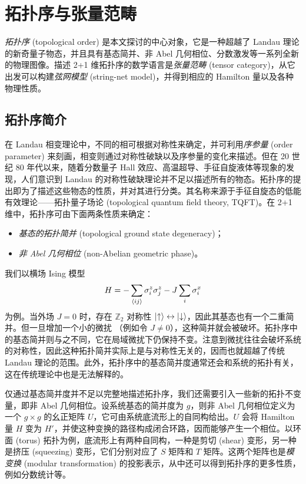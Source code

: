 \chapter{拓扑序与张量范畴}
\label{chap:topological-order}

\emph{拓扑序} (topological order) 是本文探讨的中心对象，它是一种超越了 Landau 理论的新奇量子物态，并且具有基态简并、非 Abel 几何相位、分数激发等一系列全新的物理图像。描述 2+1 维拓扑序的数学语言是\emph{张量范畴} (tensor category)，从它出发可以构建\emph{弦网模型} (string-net model)，并得到相应的 Hamilton 量以及各种物理性质。

\section{拓扑序简介}
\label{sec:topological-order}

在 Landau 相变理论中，不同的相可根据对称性来确定，并可利用\emph{序参量} (order parameter) 来刻画，相变则通过对称性破缺以及序参量的变化来描述\cite{landau1980statistical,pathria2011statistical}。但在 20 世纪 80 年代以来，随着分数量子 Hall 效应、高温超导、手征自旋液体等现象的发现，人们意识到 Landau 的对称性破缺理论并不足以描述所有的物态。拓扑序的提出即为了描述这些物态的性质，并对其进行分类。其名称来源于手征自旋态的低能有效理论——拓扑量子场论 (topological quantum field theory, TQFT)\cite{witten1989quantum}。在 2+1 维中，拓扑序可由下面两条性质来确定\cite{wen2013topological,zeng2019introduction}：

\begin{itemize}
  \item \emph{基态的拓扑简并} (topological ground state degeneracy)；
  \item \emph{非 Abel 几何相位} (non-Abelian geometric phase)。
\end{itemize}

我们以横场 Ising 模型
\begin{equation}
  H = -\sum_{\ev{ij}} \sigma^z_i\sigma^z_j - J \sum_i \sigma^x_i
\end{equation}
为例。当外场 $J=0$ 时，存在 $\mathbb{Z}_2$ 对称性 $\ket{\uparrow}\leftrightarrow\ket{\downarrow}$，因此其基态也有一个二重简并。但一旦增加一个小的微扰 （例如令 $J\neq0$），这种简并就会被破坏。拓扑序中的基态简并则与之不同，它在局域微扰下仍保持不变。注意到微扰往往会破坏系统的对称性，因此这种拓扑简并实际上是与对称性无关的，因而也就超越了传统 Landau 理论的范围。此外，拓扑序中的基态简并度通常还会和系统的拓扑有关，这在传统理论中也是无法解释的。

仅通过基态简并度并不足以完整地描述拓扑序，我们还需要引入一些新的拓扑不变量，即非 Abel 几何相位。设系统基态的简并度为 $g$，则非 Abel 几何相位定义为一个 $g\times g$ 的幺正矩阵 $U$，它可由系统底流形上的自同构给出。$U$ 会将 Hamilton 量 $H$ 变为 $H'$，并使这种变换的路径构成闭合环路，因而能够产生一个相位。以环面 (torus) 拓扑为例，底流形上有两种自同构，一种是剪切 (shear) 变形，另一种是挤压 (squeezing) 变形，它们分别对应了 $S$ 矩阵和 $T$ 矩阵。这两个矩阵也是\emph{模变换} (modular transformation) 的投影表示，从中还可以得到拓扑序的更多性质，例如分数统计等。

